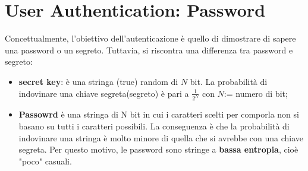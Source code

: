 \documentclass{article}
\theoremstyle{remark}
\begin{document}
\section{User Authentication: Password}
Concettualmente, l'obiettivo dell'autenticazione è quello di dimostrare di sapere una password o un segreto. Tuttavia, si riscontra una differenza tra password e segreto:\begin{itemize}
    \item \textbf{secret key}: è una stringa (true) random di $N$ bit. La probabilità di indovinare una chiave segreta(segreto) è pari a $\frac{1}{2^N}$ con $N$:= numero di bit;
    \item \textbf{Passowrd} è una stringa di N bit in cui i caratteri scelti per comporla non si basano su tutti i caratteri possibili. La conseguenza è che la probabilità di indovinare una stringa è molto minore di quella che si avrebbe con una chiave segreta. Per questo motivo, le password sono stringe a \textbf{bassa entropia}, cioè "poco" casuali. 
\end{itemize}
\end{document}
